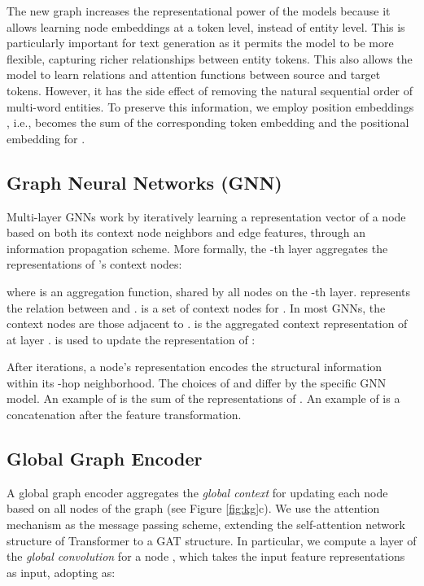 \documentclass[11pt,a4paper]{article}
\begin{document}
The new graph  increases the representational power of the models because it allows learning node embeddings at a token level, instead of entity level. This is particularly important for text generation as it permits the model to be more flexible, capturing richer relationships between entity tokens. This also allows the model to learn relations and attention functions between source and target tokens. However, it has the side effect of removing the natural sequential order of multi-word entities. To preserve this information, we employ position embeddings \cite{NIPS2017_7181}, i.e.,  becomes the sum of the corresponding token embedding and the positional embedding for .

\subsection{Graph Neural Networks (GNN)}
Multi-layer GNNs work by iteratively learning a representation vector  of a node  based on both its context node neighbors and edge features, through an information propagation scheme. More formally, the -th layer aggregates the representations of 's context nodes:

where  is an aggregation function, shared by all nodes on the -th layer.  represents the relation between  and .  is a set of context nodes for . In most GNNs, the context nodes are those adjacent to .  is the aggregated context representation of  at layer .  is used to update the representation of :


After  iterations, a node's representation encodes the structural information within its -hop neighborhood.
The choices of  and  differ by the specific GNN model. An example of  is the sum of the representations of . An example of  is a concatenation after the feature transformation. 








\subsection{Global Graph Encoder} 
\label{sec:globalgraphenc}


A global graph encoder aggregates the \textit{global context} for updating each node based on all nodes of the graph (see Figure \ref{fig:kg}c). We use the attention mechanism as the message passing scheme, extending the self-attention network structure of Transformer to a GAT structure. In particular, we compute a layer of the \textit{global convolution} for a node , which takes the input feature representations  as input, adopting  as:
\end{document}
